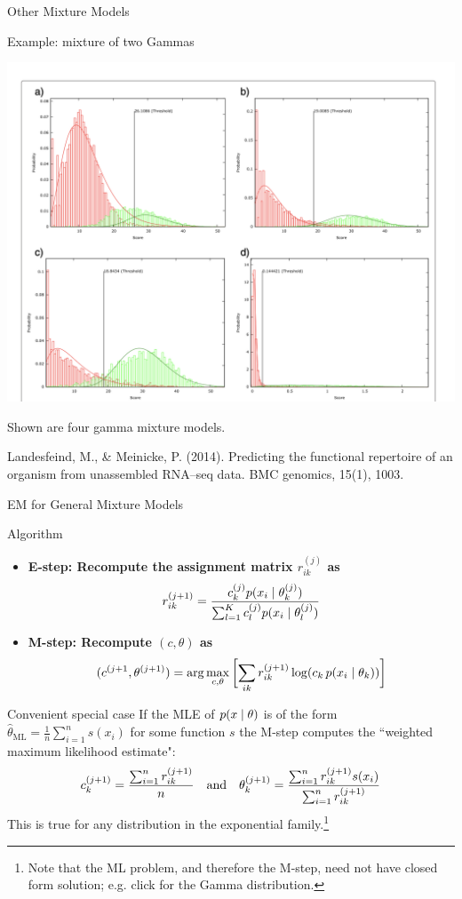 \documentclass[10pt]{beamer}
\newcommand{\sumn}{\sum_{i=1}^{n}}
\newcommand{\soft}{r} %
\begin{document}
\begin{frame}{Other Mixture Models}

\begin{sblock}{Example: mixture of two Gammas}
\begin{center}
\includegraphics[width=.6\textwidth]{images/mixture_of_two_gammas}
\end{center}
\scriptsize Shown are four gamma mixture models.
\end{sblock}

\vfill \vfill \tiny Landesfeind, M., \& Meinicke, P. (2014). Predicting the functional repertoire of an organism from unassembled RNA–seq data. BMC genomics, 15(1), 1003.

\end{frame}

\begin{frame}{EM for General Mixture Models}
\footnotesize
\begin{sblock}{Algorithm}
\begin{itemize}
\item \bf{E-step:} Recompute the assignment matrix $\soft_{ik}^{(j)}$ as
\[ \soft_{ik}^{(j+1)} = \df{c_k^{(j)}  p(x_i \cond \theta_k^{(j)}) }{ \sum_{l=1}^K c_l^{(j)}  p(x_i \cond \theta_l^{(j)})} \]
\item \bf{M-step:} Recompute $(c,\theta)$ as
\[ (c^{(j+1}, \theta^{(j+1)}) = \arg\max_{c, \theta} \bb{ \ds\sum_{ik} \soft_{ik}^{(j+1)} \log (c_k \, p(x_i \cond \theta_k)) } \]
\end{itemize}
\end{sblock}
\begin{sblock}{Convenient special case}
If the MLE of $p(x \; | \; \theta)$ is of the form $\widehat{\theta}_{\text{ML}} =\frac{1}{n} \sumn s(x_i)$ for some function $s$  the M-step computes the ``weighted maximum likelihood estimate":
\[ c_k^{(j+1)}  = \df{\sum_{i=1}^n \soft_{ik}^{(j+1)}}{n} \quad \text{and} \quad \theta_k^{(j+1)} = \df{\sumn \soft_{ik}^{(j+1)} s(x_i)}{ \sumn \soft_{ik}^{(j+1)}}\]
This is true for any distribution in the exponential family.\footnote{\tiny Note that the ML problem, and therefore the M-step, need not have closed form solution; e.g. click  for the Gamma distribution.}
\end{sblock}
\end{frame}
\end{document}
